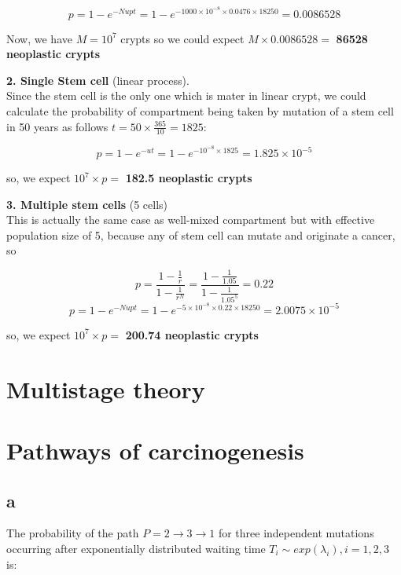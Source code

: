 \[ p=1-e^{-Nupt}=1-e^{-1000\times10^{-8}\times0.0476\times18250}=0.0086528 \]

Now, we have $M=10^7$ crypts so we could expect $M \times 0.0086528 =$  \textbf{86528 neoplastic crypts}

\textbf{2. Single Stem cell} (linear process). \\

Since the stem cell is the only one which is mater in linear crypt, we could calculate the probability of compartment being taken by mutation of a stem cell in 50 years as follows $t = 50\times\frac{365}{10}=1825 $:

\[ p=1-e^{-ut}=1-e^{-10^{-8}\times1825}=1.825\times10^{-5} \]

so, we expect $10^7 \times p =$  \textbf{182.5 neoplastic crypts}

\textbf{3.	Multiple stem cells} (5 cells)\\

 This is actually the same case as well-mixed compartment but with effective population size of 5, because any of stem cell can mutate and originate a cancer, so 

\[ p = \frac{1-\frac{1}{r}}{1 - \frac{1}{r^N}} = \frac{1-\frac{1}{1.05}}{1-\frac{1}{1.05^{5}}} = 0.22  \]
\[ p=1-e^{-Nupt}=1-e^{-5\times10^{-8}\times0.22\times18250}=2.0075\times10^{-5} \]

so, we expect $10^7 \times p = $ \textbf{200.74 neoplastic crypts}

\setcounter{chapter}{3}
\setcounter{section}{0}
\section{Multistage theory}

\setcounter{chapter}{4}
\setcounter{section}{0}
\section{Pathways of carcinogenesis}
\subsection{a}
The probability of the path $ P = 2 \rightarrow 3 \rightarrow 1 $ for three independent mutations occurring after exponentially distributed waiting time $T_i \sim exp(\lambda_i), i = 1,2,3$ is:

